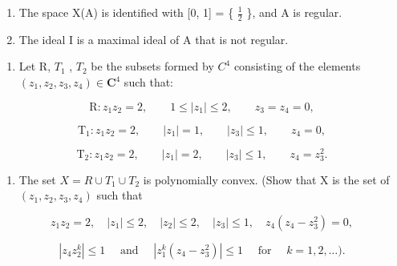 \begin{enumerate}
\def\labelenumi{\alph{enumi})}
\item
  The space X(A) is identified with {[}0, 1{]} = \{ \(\frac{1}{2}\) \}, and A is regular.
\item
  The ideal I is a maximal ideal of A that is not regular.
\end{enumerate}

\begin{enumerate}
\def\labelenumi{\arabic{enumi})}
\setcounter{enumi}{6}
\tightlist
\item
  Let R, \(T_{1}\) , \(T_{2}\) be the subsets formed by \(C^{4}\) consisting of the elements \((z_{1}, z_{2}, z_{3}, z_{4}) \in \mathbf{C}^{4}\) such that:
\end{enumerate}

\[
\mathrm{R} \colon z _ {1} z _ {2} = 2, \qquad 1 \leqslant | z _ {1} | \leqslant 2, \qquad z _ {3} = z _ {4} = 0,
\]

\[
\mathrm{T} _ {1} \colon z _ {1} z _ {2} = 2, \qquad | z _ {1} | = 1, \qquad | z _ {3} | \leqslant 1, \qquad z _ {4} = 0,
\]

\[
\mathrm{T} _ {2} \colon z _ {1} z _ {2} = 2, \qquad | z _ {1} | = 2, \qquad | z _ {3} | \leqslant 1, \qquad z _ {4} = z _ {3} ^ {2}.
\]

\begin{enumerate}
\def\labelenumi{\alph{enumi})}
\tightlist
\item
  The set \(X = R \cup T_{1} \cup T_{2}\) is polynomially convex. (Show that X is the set of \((z_{1}, z_{2}, z_{3}, z_{4})\) such that
\end{enumerate}

\[
z _ {1} z _ {2} = 2, \quad | z _ {1} | \leqslant 2, \quad | z _ {2} | \leqslant 2, \quad | z _ {3} | \leqslant 1, \quad z _ {4} (z _ {4} - z _ {3} ^ {2}) = 0,
\]

\[
| z _ {4} z _ {2} ^ {k} | \leqslant 1 \quad \text { and } \quad | z _ {1} ^ {k} (z _ {4} - z _ {3} ^ {2}) | \leqslant 1 \quad \text { for } \quad k = 1, 2, \ldots).
\]

